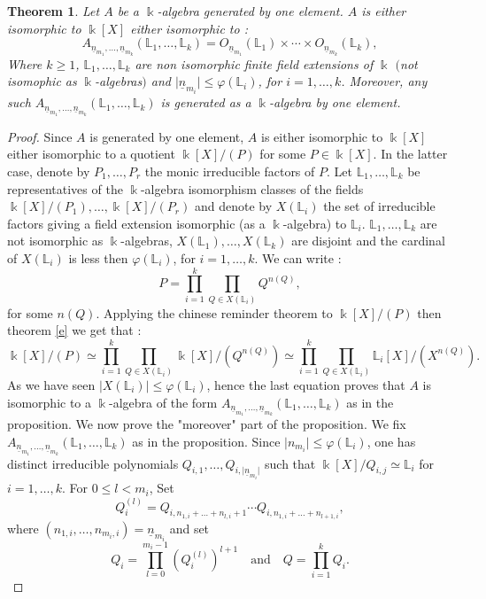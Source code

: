 \documentclass[12pt, reqno]{amsart}
\newtheorem{theorem}{Theorem}[section]
\newcommand{\K}{ {\Bbbk} }
\newcommand{\FL}{ {\mathbb L} }
\begin{document}
\begin{theorem}\label{A}
Let $A$ be a $\K$-algebra generated by one element. $A$ is either isomorphic to $\K[X]$ either isomorphic to :
$$A_{\underline{n}_{m_1},\dots, \underline{n}_{m_k}}(\FL_1,\dots ,\FL_k)=O_{\underline{n}_{m_1}}(\FL_1)\times \cdots \times O_{\underline{n}_{m_k}}(\FL_k),$$
Where $k\geq 1$, $\FL_1,\dots,\FL_k$ are non isomorphic finite field extensions of $\K$ $($not isomophic as $\K$-algebras$)$ and $\vert \underline{n}_{m_i} \vert \leq \varphi(\FL_i)$, for $i=1,\dots,k$. Moreover, any such $A_{\underline{n}_{m_1},\dots, \underline{n}_{m_k}}(\FL_1,\dots ,\FL_k)$ is generated as a $\K$-algebra by one element.
\end{theorem}
\begin{proof}
Since $A$ is generated by one element, $A$ is either isomorphic to $\K[X]$ either isomorphic to a quotient $\K[X]/(P)$ for some $P\in \K[X]$. In the latter case, denote by $P_1,\dots,P_r$ the monic irreducible factors of $P$. Let $\FL_1,\dots,\FL_k$ be representatives of the $\K$-algebra isomorphism classes of the fields $\K[X]/(P_1),\dots,\K[X]/(P_r)$ and denote by $X(\FL_i)$ the set of irreducible factors giving a field extension isomorphic (as a $\K$-algebra) to $\FL_i$. $\FL_1,\dots,\FL_k$ are not isomorphic as $\K$-algebras, $X(\FL_1),\dots,X(\FL_k)$ are disjoint and the cardinal of $X(\FL_i)$ is less then $\varphi(\FL_i)$, for $i=1,\dots,k$. We can write :
$$ P=\overset{k}{\underset{i=1}{\prod}} \underset{Q\in X(\FL_i)}{\prod} Q^{n(Q)},$$
for some $n(Q)$. Applying the chinese reminder theorem to $\K[X]/(P)$ then theorem \ref{e} we get that :
$$ \K[X]/(P) \simeq \overset{k}{\underset{i=1}{\prod}} \underset{Q\in X(\FL_i)}{\prod} \K[X]/ (Q^{n(Q)})\simeq \overset{k}{\underset{i=1}{\prod}} \underset{Q\in X(\FL_i)}{\prod} \FL_i[X]/ (X^{n(Q)}). $$
As we have seen $\vert X(\FL_i) \vert \leq \varphi(\FL_i)$, hence the last equation proves that $A$ is isomorphic to a $\K$-algebra of the form $A_{\underline{n}_{m_1},\dots, \underline{n}_{m_k}}(\FL_1,\dots ,\FL_k)$ as in the proposition. We now prove the "moreover" part of the proposition. We fix $A_{\underline{n}_{m_1},\dots, \underline{n}_{m_k}}(\FL_1,\dots ,\FL_k)$ as in the proposition. Since $\vert n_{m_i} \vert \leq \varphi(\FL_i)$, one has distinct irreducible polynomials $Q_{i,1},\dots,Q_{i,\vert \underline{n}_{m_i} \vert}$ such that $\K[X]/Q_{i,j} \simeq \FL_i$ for $i=1,\dots,k$. For $0\leq l< m_i$, Set $$Q_i^{(l)}=Q_{i,n_{1,i}+\dots+n_{l,i}+1}\cdots Q_{i,n_{1,i}+\dots+n_{l+1,i}},$$where $(n_{1,i},\dots, n_{m_i,i})=\underline{n}_{m_i}$ and set $$ Q_i=\overset{m_i-1}{\underset{l=0}{\prod}}(Q_i^{(l)})^{l+1}\quad \text{and} \quad Q=\overset{k}{\underset{i=1}{\prod}}Q_i.$$

\end{proof}
\end{document}

